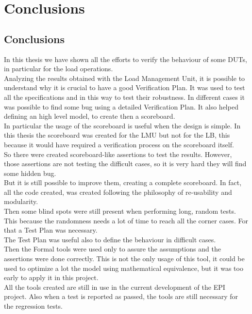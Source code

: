 \chapter{Conclusions}
\section{Conclusions}
In this thesis we have shown all the efforts to verify the behaviour of some DUTs, in particular for the load operations.\\

Analyzing the results obtained with the Load Management Unit, it is possible to understand why it is crucial to have a good Verification Plan. It was used to test all the specifications and in this way to test their robustness. In different cases it was possible to find some bug using a detailed Verification Plan. It also helped defining an high level model, to create then a scoreboard.\\

In particular the usage of the scoreboard is useful when the design is simple. In this thesis the scoreboard was created for the LMU but not for the LB, this because it would have required a verification process on the scoreboard itself.\\

So there were created scoreboard-like assertions to test the results. However, those assertions are not testing the difficult cases, so it is very hard they will find some hidden bug. \\
But it is still possible to improve them, creating a complete scoreboard. In fact, all the code created, was created following the philosophy of re-usability and modularity.\\

Then some blind spots were still present when performing long, random tests. This because the randomness needs a lot of time to reach all the corner cases. For that a Test Plan was necessary.\\
The Test Plan was useful also to define the behaviour in difficult cases.\\

Then the Formal tools were used only to assure the assumptions and the assertions were done correctly. This is not the only usage of this tool, it could be used to optimize a lot the model using mathematical equivalence, but it was too early to apply it in this project.\\

All the tools created are still in use in the current development of the EPI project. Also when a test is reported as passed, the tools are still necessary for the regression tests.



